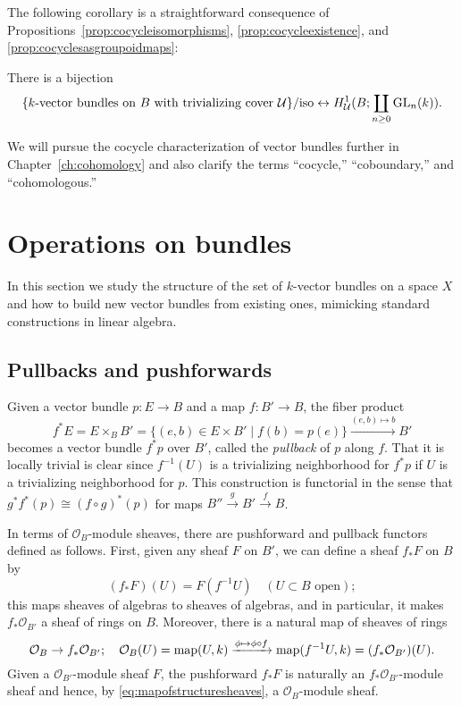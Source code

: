 \documentclass[a4paper,openany]{scrbook}
\begin{document}
The following corollary is a straightforward consequence of Propositions~\ref{prop:cocycleisomorphisms}, \ref{prop:cocycleexistence}, and \ref{prop:cocyclesasgroupoidmaps}:
\begin{corollary} \label{cor:cocycleidentification}
There is a bijection
\[
\{\text{$k$-vector bundles on $B$ with trivializing cover $\mathcal U$}\}/\text{iso} \leftrightarrow H^1_{\mathcal U}(B;\coprod_{n \geq 0} \operatorname{GL}_n(k)).
\]
\end{corollary}

We will pursue the cocycle characterization of vector bundles further in Chapter~\ref{ch:cohomology} and also clarify the terms “cocycle,” “coboundary,” and “cohomologous.”


\section{Operations on bundles}

In this section we study the structure of the set of $k$-vector bundles on a space $X$ and how to build new vector bundles from existing ones, mimicking standard constructions in linear algebra. 

\subsection{Pullbacks and pushforwards} \label{subsec:pullback-pushforward}

Given a vector bundle $p\colon E \to B$ and a map $f\colon B' \to B$, the fiber product
\[
f^*E = E \times_B B' = \{(e,b) \in E \times B' \mid f(b) = p(e)\} \xrightarrow{(e,b) \mapsto b} B'
\]
becomes a vector bundle $f^*p$ over $B'$, called the \emph{pullback} of $p$ along $f$. That it is locally trivial is clear since $f^{-1}(U)$ is a trivializing neighborhood for $f^*p$ if $U$ is a trivializing neighborhood for $p$. This construction is functorial in the sense that $g^*f^*(p) \cong (f \circ g)^*(p)$ for maps $B'' \xrightarrow{g} B' \xrightarrow{f} B$.

In terms of $\mathcal O_B$-module sheaves, there are pushforward and pullback functors defined as follows. First, given any sheaf $F$ on $B'$, we can define a sheaf $f_*F$ on $B$ by
\[
(f_*F)(U) = F(f^{-1}U) \quad (U \subset B \text{ open});
\]
this maps sheaves of algebras to sheaves of algebras, and in particular, it makes $f_*\mathcal O_{B'}$ a sheaf of rings on $B$. Moreover, there is a natural map of sheaves of rings
\begin{equation}\label{eq:mapofstructuresheaves}
\mathcal O_{B} \to f_*\mathcal O_{B'}; \quad \mathcal O_B(U) = \operatorname{map}(U,k) \xrightarrow{\phi \mapsto \phi \circ f} \operatorname{map}(f^{-1}U,k) = (f_*\mathcal O_{B'})(U).
\end{equation}
Given a $\mathcal O_{B'}$-module sheaf $F$, the pushforward $f_*F$ is naturally an $f_*\mathcal O_{B'}$-module sheaf and hence, by \eqref{eq:mapofstructuresheaves}, a $\mathcal O_B$-module sheaf.
\end{document}
